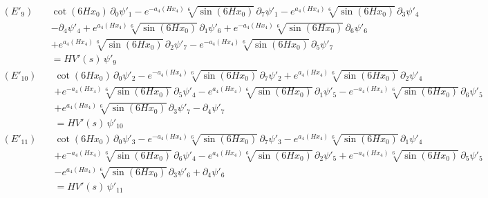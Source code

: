 \begin{align*}
(E'_{9})\quad & \cot \left(6 H x_0\right)\,\partial_{0}\psi'_{1} - e^{-a_4\left(H x_4\right)} \sqrt[6]{\sin \left(6 H x_0\right)}\,\partial_{7}\psi'_{1} - e^{a_4\left(H x_4\right)} \sqrt[6]{\sin \left(6 H x_0\right)}\,\partial_{3}\psi'_{4} \\
 &  - \partial_{4}\psi'_{4} + e^{a_4\left(H x_4\right)} \sqrt[6]{\sin \left(6 H x_0\right)}\,\partial_{1}\psi'_{6} + e^{-a_4\left(H x_4\right)} \sqrt[6]{\sin \left(6 H x_0\right)}\,\partial_{6}\psi'_{6} \\
 &  + e^{a_4\left(H x_4\right)} \sqrt[6]{\sin \left(6 H x_0\right)}\,\partial_{2}\psi'_{7} - e^{-a_4\left(H x_4\right)} \sqrt[6]{\sin \left(6 H x_0\right)}\,\partial_{5}\psi'_{7} \\
 & = H V'(s)\,\psi'_{9}
\end{align*}
\begin{align*}
(E'_{10})\quad & \cot \left(6 H x_0\right)\,\partial_{0}\psi'_{2} - e^{-a_4\left(H x_4\right)} \sqrt[6]{\sin \left(6 H x_0\right)}\,\partial_{7}\psi'_{2} + e^{a_4\left(H x_4\right)} \sqrt[6]{\sin \left(6 H x_0\right)}\,\partial_{2}\psi'_{4} \\
 &  + e^{-a_4\left(H x_4\right)} \sqrt[6]{\sin \left(6 H x_0\right)}\,\partial_{5}\psi'_{4} - e^{a_4\left(H x_4\right)} \sqrt[6]{\sin \left(6 H x_0\right)}\,\partial_{1}\psi'_{5} - e^{-a_4\left(H x_4\right)} \sqrt[6]{\sin \left(6 H x_0\right)}\,\partial_{6}\psi'_{5} \\
 &  + e^{a_4\left(H x_4\right)} \sqrt[6]{\sin \left(6 H x_0\right)}\,\partial_{3}\psi'_{7} - \partial_{4}\psi'_{7} \\
 & = H V'(s)\,\psi'_{10}
\end{align*}
\begin{align*}
(E'_{11})\quad & \cot \left(6 H x_0\right)\,\partial_{0}\psi'_{3} - e^{-a_4\left(H x_4\right)} \sqrt[6]{\sin \left(6 H x_0\right)}\,\partial_{7}\psi'_{3} - e^{a_4\left(H x_4\right)} \sqrt[6]{\sin \left(6 H x_0\right)}\,\partial_{1}\psi'_{4} \\
 &  + e^{-a_4\left(H x_4\right)} \sqrt[6]{\sin \left(6 H x_0\right)}\,\partial_{6}\psi'_{4} - e^{a_4\left(H x_4\right)} \sqrt[6]{\sin \left(6 H x_0\right)}\,\partial_{2}\psi'_{5} + e^{-a_4\left(H x_4\right)} \sqrt[6]{\sin \left(6 H x_0\right)}\,\partial_{5}\psi'_{5} \\
 &  - e^{a_4\left(H x_4\right)} \sqrt[6]{\sin \left(6 H x_0\right)}\,\partial_{3}\psi'_{6} + \partial_{4}\psi'_{6} \\
 & = H V'(s)\,\psi'_{11}
\end{align*}
